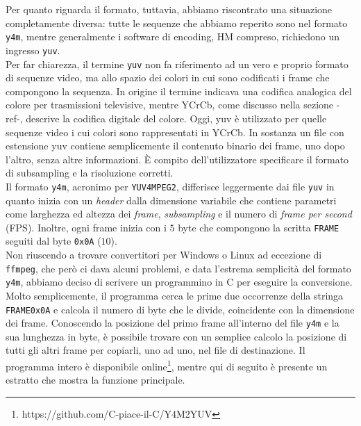 Per quanto riguarda il formato, tuttavia, 
abbiamo riscontrato una situazione completamente diversa: tutte le sequenze che 
abbiamo reperito sono nel formato \verb|y4m|, mentre generalmente i software di 
encoding, HM compreso, richiedono un ingresso \verb|yuv|.\\
Per far chiarezza, il termine \verb|yuv| non fa riferimento ad un vero e 
proprio formato di sequenze video, ma allo spazio dei colori in cui sono 
codificati i frame che compongono la sequenza. In origine il termine indicava 
una codifica analogica del colore per trasmissioni televisive, mentre YCrCb, 
come discusso nella sezione -ref-, descrive la codifica digitale del colore. 
Oggi, yuv è utilizzato per quelle sequenze video i cui colori sono 
rappresentati in YCrCb.
In sostanza un file con estensione yuv contiene semplicemente il contenuto 
binario dei frame, uno dopo l'altro, senza altre informazioni. \`E compito 
dell'utilizzatore specificare il formato di subsampling e la risoluzione 
corretti. \\
Il formato \verb|y4m|, acronimo per \verb|YUV4MPEG2|, differisce leggermente 
dai file \verb|yuv| in quanto inizia con un \textit{header} dalla dimensione 
variabile che contiene parametri come larghezza ed altezza dei \textit{frame}, 
\textit{subsampling} e il numero di \textit{frame per second} (FPS). Inoltre, 
ogni frame inizia con i $5$ byte che compongono la scritta \verb|FRAME| seguiti 
dal byte \verb|0x0A| ($10$). \\
Non riuscendo a trovare convertitori per Windows o Linux ad eccezione di 
\verb|ffmpeg|, che però ci dava alcuni problemi, e data l'estrema semplicità 
del formato \verb|y4m|, abbiamo deciso di scrivere un programmino in C per 
eseguire la conversione. \\
Molto semplicemente, il programma cerca le prime due occorrenze della stringa   
\verb|FRAME0x0A| e calcola il numero di byte che le divide, coincidente con la 
dimensione dei frame. Conoscendo la posizione del primo frame all'interno del 
file \verb|y4m| e la sua lunghezza in byte, è possibile trovare con un semplice 
calcolo la posizione di tutti gli altri frame per copiarli, uno ad uno, nel 
file di destinazione.
Il programma intero è disponibile 
online\footnote{https://github.com/C-piace-il-C/Y4M2YUV}, mentre qui di seguito 
è presente un estratto che mostra la funzione principale. \\
\lstset{style=cstyle}


